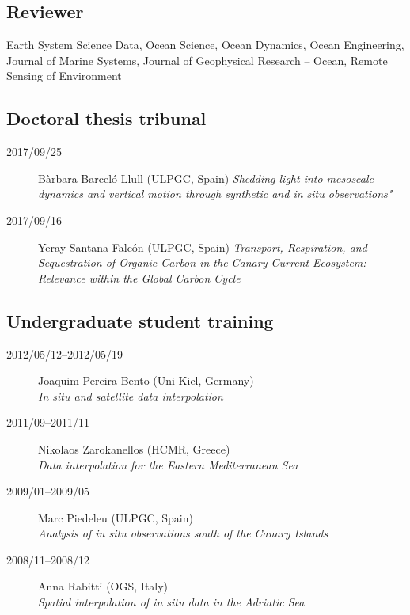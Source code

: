 \documentclass[11pt,a4paper,svgnames]{article}
\begin{document}
\subsection{Reviewer}

Earth System Science Data, Ocean Science, Ocean Dynamics, Ocean Engineering, Journal of Marine Systems, Journal of Geophysical Research -- Ocean, Remote Sensing of Environment

\subsection{Doctoral thesis tribunal}

\begin{description}
\item[2017/09/25] Bàrbara Barceló-Llull (ULPGC, Spain) {\newline \textit{Shedding light into mesoscale dynamics and vertical motion through synthetic and in situ observations"}}

\item[2017/09/16] Yeray Santana Falc\'{o}n (ULPGC, Spain) {\newline \textit{Transport, Respiration, and Sequestration of Organic Carbon in the Canary Current Ecosystem: Relevance within the Global Carbon Cycle}}
\end{description}

\subsection{Undergraduate student training}
\begin{description}
\item[2012/05/12--2012/05/19] Joaquim Pereira Bento (Uni-Kiel, Germany)\\ \textit{In situ and satellite data interpolation}
\item[2011/09--2011/11] Nikolaos Zarokanellos (HCMR, Greece) \\ \textit{Data interpolation for the Eastern Mediterranean Sea}
\item[2009/01--2009/05] Marc Piedeleu (ULPGC, Spain)\\ \textit{Analysis of in situ observations south of the Canary Islands}
\item[2008/11--2008/12] Anna Rabitti (OGS, Italy)\\ \textit{Spatial interpolation of in situ data in the Adriatic Sea}
\end{description}
\end{document}
